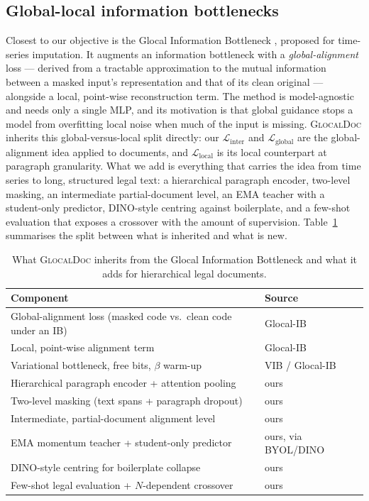\documentclass[conference]{IEEEtran}
\newcommand{\glocal}{\textsc{GlocalDoc}}
\begin{document}
\subsection{Global-local information bottlenecks}
Closest to our objective is the Glocal Information Bottleneck \cite{yang2025glocal},
proposed for time-series imputation. It augments an information bottleneck with a
\emph{global-alignment} loss --- derived from a tractable approximation to the mutual
information between a masked input's representation and that of its clean original ---
alongside a local, point-wise reconstruction term. The method is model-agnostic and
needs only a single MLP, and its motivation is that global guidance stops a model
from overfitting local noise when much of the input is missing. \glocal{} inherits
this global-versus-local split directly: our $\mathcal{L}_{\mathrm{inter}}$ and
$\mathcal{L}_{\mathrm{global}}$ are the global-alignment idea applied to documents,
and $\mathcal{L}_{\mathrm{local}}$ is its local counterpart at paragraph
granularity. What we add is everything that carries the idea from time series to
long, structured legal text: a hierarchical paragraph encoder, two-level masking, an
intermediate partial-document level, an EMA teacher with a student-only predictor,
DINO-style centring against boilerplate, and a few-shot evaluation that exposes a
crossover with the amount of supervision. Table~\ref{tab:inherit} summarises the
split between what is inherited and what is new.

\begin{table}[t]
\centering
\caption{What \glocal{} inherits from the Glocal Information Bottleneck
\cite{yang2025glocal} and what it adds for hierarchical legal documents.}
\label{tab:inherit}
\footnotesize
\begin{tabular}{@{}p{} l@{}}
\toprule
Component & Source \\
\midrule
Global-alignment loss (masked code vs.\ clean code under an IB) & Glocal-IB \\
Local, point-wise alignment term & Glocal-IB \\
Variational bottleneck, free bits, $\beta$ warm-up & VIB / Glocal-IB \\
Hierarchical paragraph encoder + attention pooling & ours \\
Two-level masking (text spans + paragraph dropout) & ours \\
Intermediate, partial-document alignment level & ours \\
EMA momentum teacher + student-only predictor & ours, via BYOL/DINO \\
DINO-style centring for boilerplate collapse & ours \\
Few-shot legal evaluation + $N$-dependent crossover & ours \\
\bottomrule
\end{tabular}
\end{table}
\end{document}
